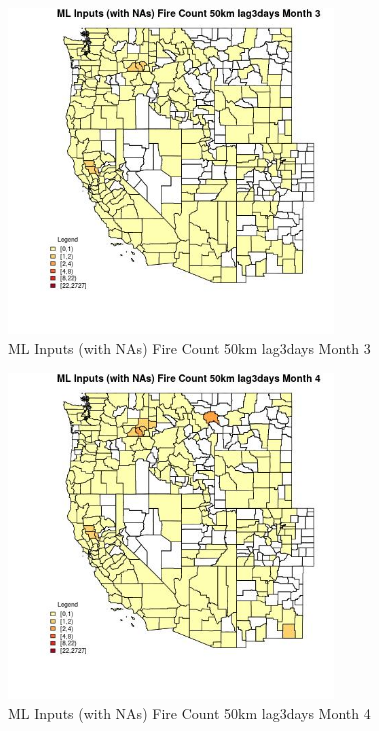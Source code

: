 \begin{figure} 
\centering  
\includegraphics[width=0.77\textwidth]{Code_Outputs/Report_ML_input_PM25_Step4_part_f_de_duplicated_aveswNAs_CountyFire_Count_50km_lag3daysmedianMonth3.jpg} 
\caption{\label{fig:Report_ML_input_PM25_Step4_part_f_de_duplicated_aveswNAsCountyFire_Count_50km_lag3daysmedianMonth3}ML Inputs (with NAs) Fire Count 50km lag3days Month 3} 
\end{figure} 
 

\begin{figure} 
\centering  
\includegraphics[width=0.77\textwidth]{Code_Outputs/Report_ML_input_PM25_Step4_part_f_de_duplicated_aveswNAs_CountyFire_Count_50km_lag3daysmedianMonth4.jpg} 
\caption{\label{fig:Report_ML_input_PM25_Step4_part_f_de_duplicated_aveswNAsCountyFire_Count_50km_lag3daysmedianMonth4}ML Inputs (with NAs) Fire Count 50km lag3days Month 4} 
\end{figure} 
 

